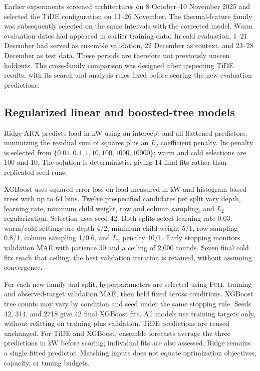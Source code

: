 \documentclass[conference]{IEEEtran}
\newcommand{\full}{\textsc{Full}}
\begin{document}
Earlier experiments screened architectures on 8 October--10 November 2025 and selected the TiDE configuration on 11--26 November. The thermal-feature family was subsequently selected on the same intervals with the corrected model. Warm evaluation dates had appeared in earlier training data. In cold evaluation, 1--21 December had served as ensemble validation, 22 December as context, and 23--28 December as test data. These periods are therefore not previously unseen holdouts. The cross-family comparison was designed after inspecting TiDE results, with its search and analysis rules fixed before scoring the new evaluation predictions.

\subsection{Regularized linear and boosted-tree models}
Ridge-ARX predicts load in kW using an intercept and all flattened predictors, minimizing the residual sum of squares plus an $L_2$ coefficient penalty. Its penalty is selected from $\{0.01,0.1,1,10,100,1000,10000\}$; warm and cold selections are 100 and 10. The solution is deterministic, giving 14 final fits rather than replicated seed runs.

XGBoost uses squared-error loss on load measured in kW and histogram-based trees with up to 64 bins. Twelve prespecified candidates per split vary depth, learning rate, minimum child weight, row and column sampling, and $L_2$ regularization. Selection uses seed 42. Both splits select learning rate 0.03; warm/cold settings are depth 4/2, minimum child weight 5/1, row sampling 0.8/1, column sampling 1/0.6, and $L_2$ penalty 10/1. Early stopping monitors validation MAE with patience 50 and a ceiling of 2,000 rounds. Seven final cold fits reach that ceiling; the best validation iteration is retained, without assuming convergence.

For each new family and split, hyperparameters are selected using \full\ training and observed-target validation MAE, then held fixed across conditions. XGBoost tree counts may vary by condition and seed under the same stopping rule. Seeds 42, 314, and 2718 give 42 final XGBoost fits. All models use training targets only, without refitting on training plus validation. TiDE predictions are reused unchanged. For TiDE and XGBoost, ensemble forecasts average the three predictions in kW before scoring; individual fits are also assessed. Ridge remains a single fitted predictor. Matching inputs does not equate optimization objectives, capacity, or tuning budgets.
\end{document}
